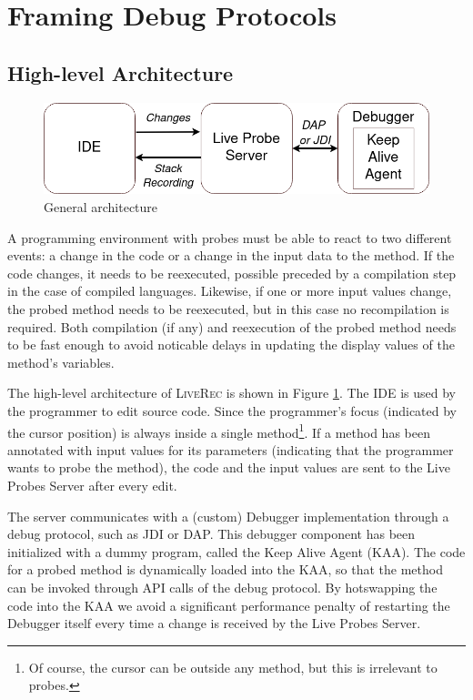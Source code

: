 \documentclass[english,submission]{programming}
\def\coolname{\textsc{LiveRec}\xspace}
\begin{document}
\section{Framing Debug Protocols}
\label{sec:stack-recording}

\subsection{High-level Architecture}

\begin{figure}[h]
  \centering
  \includegraphics[width=0.8\linewidth]{img/architecture_2.png}
  \caption{General architecture}
  \label{fig:architecture}
\end{figure}

A programming environment with probes must be able to react to two different events: a change in the code or a change in the input data to the method. 
If the code changes, it needs to be reexecuted, possible preceded by a compilation step in the case of compiled languages.
Likewise, if one or more input values change, the probed method needs to be reexecuted, but in this case no recompilation is required. 
Both compilation (if any) and reexecution of the probed method needs to be fast enough to avoid noticable delays in updating the display values of the method's variables.

The high-level architecture of \coolname is shown in Figure \ref{fig:architecture}.
The IDE is used by the programmer to edit source code. Since the programmer's focus (indicated by the cursor position) is always inside a single method\footnote{Of course, the cursor can be outside any method, but this is irrelevant to probes.}. If a method has been annotated with input values for its parameters (indicating that the programmer wants to probe the method), the code and the input values are sent to the Live Probes Server after every edit. 

The server communicates with a (custom) Debugger implementation through a debug protocol, such as JDI or DAP. 
This debugger component has been initialized with a dummy program, called the Keep Alive Agent (KAA). The code for a probed method is dynamically loaded into the KAA, so that the method can be invoked through API calls of the debug protocol. By hotswapping the code into the KAA we avoid a significant performance penalty of restarting the Debugger itself every time a change is received by the Live Probes Server. 
\end{document}

